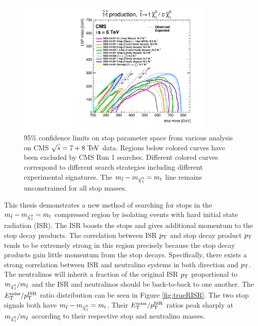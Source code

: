 \begin{figure}[h!]
\centering
    \includegraphics[width=0.85\textwidth, angle=270]{figures/8TeV/T2tt_2015.pdf}\hspace{0.05\textwidth}
\caption[95\% confidence limits on stop parameter space from various analysis on CMS $\sqrt{s} = 7+8 \tev$ data]{ 95\% confidence limits on stop parameter space from various analysis on CMS $\sqrt{s} = 7+8 \tev$ data.  Regions below colored curves have been excluded by CMS Run 1 searches.  Different colored curves correspond to different search strategies including different experimental signatures. The $m_{\stop}-m_{\ninoone} = m_t$ line remains unconstrained for all stop masses.  }
\label{fig:CMS:8TeVResult}
\end{figure}


\indent This thesis demonstrates a new method of searching for stops in the $m_{\stop}-m_{\ninoone} = m_t$ compressed region by isolating events with hard initial state radiation (ISR).  The ISR boosts the stops and gives additional momentum to the stop decay products.  The correlation between ISR $p_{\mathrm{T}}$ and stop decay product $p_{\mathrm{T}}$ tends to be extremely strong in this region precisely because the stop decay products gain little momentum from the stop decays.  Specifically, there exists a strong correlation between ISR and neutralino systems in both direction and $p_{\mathrm{T}}$.  \\

\indent The neutralinos will inherit a fraction of the original ISR $p_{\mathrm{T}}$ proportional to  $m_{\ninoone}/m_{\stop}$ and the ISR and neutralinos should be back-to-back to one another.  The $E_{\mathrm{T}}^{\mathrm{miss}}/p_{\mathrm{T}}^{\mathrm{ISR}}$ ratio distribution can be seen in Figure \ref{fig:trueRISR}.  The two stop signals both have $m_{\stop}-m_{\ninoone} = m_t$.  Their $E_{\mathrm{T}}^{\mathrm{miss}}/p_{\mathrm{T}}^{\mathrm{ISR}}$ ratios peak sharply at $m_{\ninoone}/m_{\stop}$ according to their respective stop and neutralino masses.  \\


